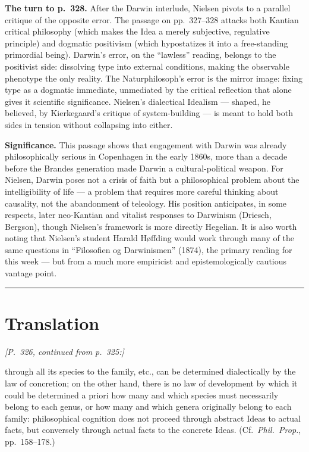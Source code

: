 \documentclass[12pt,a4paper]{article}
\begin{document}
\medskip\noindent\textbf{The turn to p.\ 328.} After the Darwin
interlude, Nielsen pivots to a parallel critique of the opposite
error. The passage on pp.\ 327--328 attacks both Kantian critical
philosophy (which makes the Idea a merely subjective, regulative
principle) and dogmatic positivism (which hypostatizes it into a
free-standing primordial being). Darwin's error, on the
``lawless'' reading, belongs to the positivist side: dissolving
type into external conditions, making the observable phenotype
the only reality. The Naturphilosoph's error is the mirror image:
fixing type as a dogmatic immediate, unmediated by the critical
reflection that alone gives it scientific significance. Nielsen's
dialectical Idealism --- shaped, he believed, by Kierkegaard's
critique of system-building --- is meant to hold both sides in
tension without collapsing into either.

\medskip\noindent\textbf{Significance.} This passage shows that
engagement with Darwin was already philosophically serious in
Copenhagen in the early 1860s, more than a decade before the
Brandes generation made Darwin a cultural-political weapon. For
Nielsen, Darwin poses not a crisis of faith but a philosophical
problem about the intelligibility of life --- a problem that
requires more careful thinking about causality, not the
abandonment of teleology. His position anticipates, in some
respects, later neo-Kantian and vitalist responses to Darwinism
(Driesch, Bergson), though Nielsen's framework is more directly
Hegelian. It is also worth noting that Nielsen's student
Harald H\o ffding would work through many of the same questions
in ``Filosofien og Darwinismen'' (1874), the primary reading for
this week --- but from a much more empiricist and
epistemologically cautious vantage point.

\bigskip
\hrule
\bigskip


\section*{Translation}

\noindent\textit{[P.\ 326, continued from p.\ 325:]}

\medskip

\noindent through all its species to the family, etc., can be
determined dialectically by the law of concretion; on the other
hand, there is no law of development by which it could be
determined a priori how many and which species must necessarily
belong to each genus, or how many and which genera originally
belong to each family: philosophical cognition does not proceed
through abstract Ideas to actual facts, but conversely through
actual facts to the concrete Ideas. (Cf.\ \emph{Phil.\ Prop.},
pp.\ 158--178.)
\end{document}
